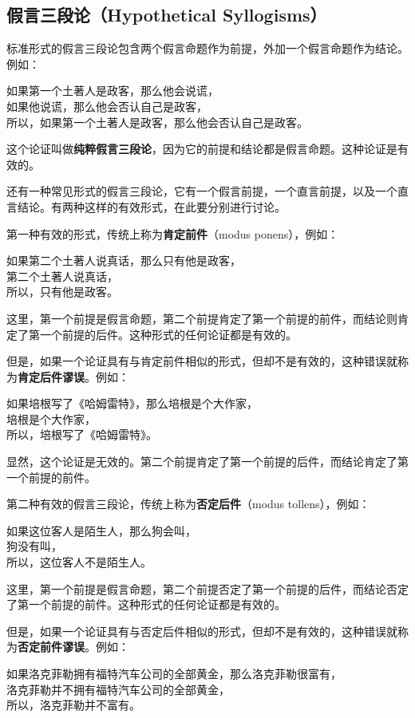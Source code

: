 \subsection{假言三段论（Hypothetical Syllogisms）}
标准形式的假言三段论包含两个假言命题作为前提，外加一个假言命题作为结论。例如：

如果第一个土著人是政客，那么他会说谎，\\
如果他说谎，那么他会否认自己是政客，\\
所以，如果第一个土著人是政客，那么他会否认自己是政客。

这个论证叫做\textbf{纯粹假言三段论}，因为它的前提和结论都是假言命题。这种论证是有效的。\cite{boole1854}

还有一种常见形式的假言三段论，它有一个假言前提，一个直言前提，以及一个直言结论。有两种这样的有效形式，在此要分别进行讨论。

第一种有效的形式，传统上称为\textbf{肯定前件}（modus ponens），例如：

如果第二个土著人说真话，那么只有他是政客，\\
第二个土著人说真话，\\
所以，只有他是政客。

这里，第一个前提是假言命题，第二个前提肯定了第一个前提的前件，而结论则肯定了第一个前提的后件。这种形式的任何论证都是有效的。

但是，如果一个论证具有与肯定前件相似的形式，但却不是有效的，这种错误就称为\textbf{肯定后件谬误}。例如：

如果培根写了《哈姆雷特》，那么培根是个大作家，\\
培根是个大作家，\\
所以，培根写了《哈姆雷特》。

显然，这个论证是无效的。第二个前提肯定了第一个前提的后件，而结论肯定了第一个前提的前件。

第二种有效的假言三段论，传统上称为\textbf{否定后件}（modus tollens），例如：

如果这位客人是陌生人，那么狗会叫，\\
狗没有叫，\\
所以，这位客人不是陌生人。

这里，第一个前提是假言命题，第二个前提否定了第一个前提的后件，而结论否定了第一个前提的前件。这种形式的任何论证都是有效的。

但是，如果一个论证具有与否定后件相似的形式，但却不是有效的，这种错误就称为\textbf{否定前件谬误}。例如：

如果洛克菲勒拥有福特汽车公司的全部黄金，那么洛克菲勒很富有，\\
洛克菲勒并不拥有福特汽车公司的全部黄金，\\
所以，洛克菲勒并不富有。


